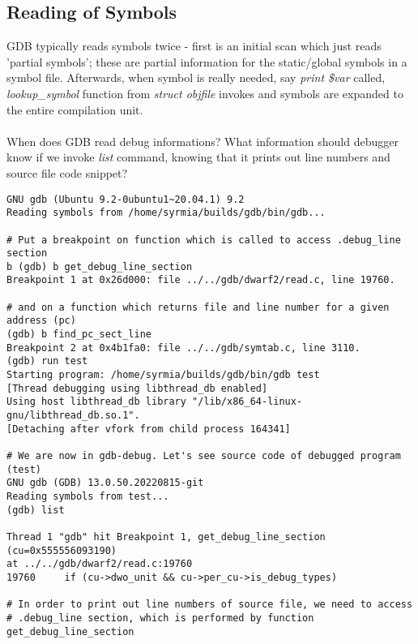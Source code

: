 \documentclass{report}
\begin{document}
\subsection *{Reading of Symbols}
GDB typically reads symbols twice - first is an initial scan which just
reads 'partial symbols'; these are partial information for the
static/global symbols in a symbol file.
Afterwards, when symbol is really needed, say \textit{print \$var} called, \textit{lookup\_symbol} function from \textit{struct objfile} invokes and symbols are expanded to the entire compilation unit. \\ \\
When does GDB read debug informations?
What information should debugger know if we invoke \textit{list} command, knowing that it prints out line numbers and source file code snippet?
\begin{verbatim}
GNU gdb (Ubuntu 9.2-0ubuntu1~20.04.1) 9.2
Reading symbols from /home/syrmia/builds/gdb/bin/gdb...

# Put a breakpoint on function which is called to access .debug_line section
b (gdb) b get_debug_line_section
Breakpoint 1 at 0x26d000: file ../../gdb/dwarf2/read.c, line 19760.

# and on a function which returns file and line number for a given address (pc)
(gdb) b find_pc_sect_line
Breakpoint 2 at 0x4b1fa0: file ../../gdb/symtab.c, line 3110.
(gdb) run test
Starting program: /home/syrmia/builds/gdb/bin/gdb test
[Thread debugging using libthread_db enabled]
Using host libthread_db library "/lib/x86_64-linux-gnu/libthread_db.so.1".
[Detaching after vfork from child process 164341]

# We are now in gdb-debug. Let's see source code of debugged program (test)
GNU gdb (GDB) 13.0.50.20220815-git
Reading symbols from test...
(gdb) list

Thread 1 "gdb" hit Breakpoint 1, get_debug_line_section (cu=0x555556093190)
at ../../gdb/dwarf2/read.c:19760
19760	  if (cu->dwo_unit && cu->per_cu->is_debug_types)

# In order to print out line numbers of source file, we need to access 
# .debug_line section, which is performed by function get_debug_line_section


\end{verbatim}
\end{document}
